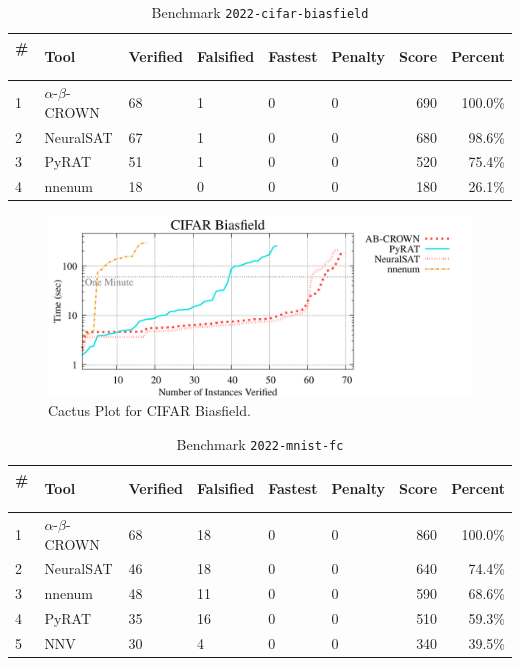 
\begin{table}[h]
\begin{center}
\caption{Benchmark \texttt{2022-cifar-biasfield}} \label{tab:cat_{cat}}
{\setlength{\tabcolsep}{2pt}
\begin{tabular}[h]{@{}llllllrr@{}}
\toprule
\textbf{\# ~} & \textbf{Tool} & \textbf{Verified} & \textbf{Falsified} & \textbf{Fastest} & \textbf{Penalty} & \textbf{Score} & \textbf{Percent}\\
\midrule
1 & $\alpha$-$\beta$-CROWN & 68 & 1 & 0 & 0 & 690 & 100.0\% \\
2 & NeuralSAT & 67 & 1 & 0 & 0 & 680 & 98.6\% \\
3 & PyRAT & 51 & 1 & 0 & 0 & 520 & 75.4\% \\
4 & nnenum & 18 & 0 & 0 & 0 & 180 & 26.1\% \\
\bottomrule
\end{tabular}
}
\end{center}
\end{table}



\begin{figure}[h]
\centerline{\includegraphics[width=\textwidth]{cactus/2022_cifar_biasfield.pdf}}
\caption{Cactus Plot for CIFAR Biasfield.}
\label{fig:quantPic}
\end{figure}



\begin{table}[h]
\begin{center}
\caption{Benchmark \texttt{2022-mnist-fc}} \label{tab:cat_{cat}}
{\setlength{\tabcolsep}{2pt}
\begin{tabular}[h]{@{}llllllrr@{}}
\toprule
\textbf{\# ~} & \textbf{Tool} & \textbf{Verified} & \textbf{Falsified} & \textbf{Fastest} & \textbf{Penalty} & \textbf{Score} & \textbf{Percent}\\
\midrule
1 & $\alpha$-$\beta$-CROWN & 68 & 18 & 0 & 0 & 860 & 100.0\% \\
2 & NeuralSAT & 46 & 18 & 0 & 0 & 640 & 74.4\% \\
3 & nnenum & 48 & 11 & 0 & 0 & 590 & 68.6\% \\
4 & PyRAT & 35 & 16 & 0 & 0 & 510 & 59.3\% \\
5 & NNV & 30 & 4 & 0 & 0 & 340 & 39.5\% \\
\bottomrule
\end{tabular}
}
\end{center}
\end{table}



